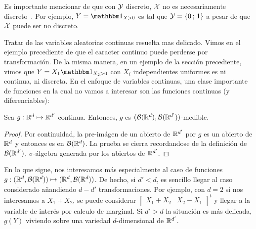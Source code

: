 Es  importante mencionar de  que con  $\mathcal{Y}$ discreto,  $\mathcal{X}$ no  es necesariamente
discreto~\cite{AthLah06}. Por ejemplo, $Y = \un_{X>0}$  es tal que $\mathcal{Y} = \{ 0 \, ; \, 1 \}$ a pesar de que $\mathcal{X}$ puede ser no discreto.

Tratar de las variables aleatorias  continuas resuelta mas delicado. Vimos en el
ejemplo   precediente  de   que  el   caracter  continuo   puede   perderse  por
transformaci\'on. De la misma manera, en un ejemplo de la secci\'on precediente,
vimos  que  $Y =  X_1  \un_{X_2>0}$ con  $X_i$  independientes  uniformes es  ni
continua,  ni  discreta.  En  el  enfoque  de  variables  continuas,  una  clase
importante  de funciones  en la  cual  no vamos  a interesar  son las  funciones
continuas (y diferenciables):
%
\begin{lema}
\label{Lem:MP:ContinuidadCaracterMedible}
%
  Sea   $g:   \mathbb{R}^d   \mapsto   \mathbb{R}^{d'}$   continua.   Entonces,   $g$   es
  $(\mathcal{B}(\mathbb{R}^d),\mathcal{B}(\mathbb{R}^{d'}))$-medible.
\end{lema}
%
\begin{proof}
  Por continuidad,  la pre-im\'agen de  un abierto de  $\mathbb{R}^{d'}$ por $g$  es un
  abierto  de $\mathbb{R}^d$  y entonces  es en  $\mathcal{B}(\mathbb{R}^d)$. La  prueba  se cierra
  recordandose  de  la   definici\'on  de  $\mathcal{B}(\mathbb{R}^{d'})$,  $\sigma$-\'algebra
  generada por los abiertos de $\mathbb{R}^{d'}$.
\end{proof}

En lo  que sigue, nos interesamos  m\'as especialmente al caso  de funciones $g:
(\mathbb{R}^d ,  \mathcal{B}(\mathbb{R}^d)) \mapsto (\mathbb{R}^d ,  \mathcal{B}(\mathbb{R}^d))$.  De hecho,  si $d' <
d$,   es    sencillo   llegar   al   caso    considerado   a\~nandiendo   $d-d'$
transformaciones. Por ejemplo, con $d = 2$  si nos interesamos a $X_1 + X_2$, se
puede considerar $\begin{bmatrix} X_1 + X_2 & X_2 - X_1\end{bmatrix}^t$ y llegar
a la variable de  inter\'es por calculo de marginal. Si $d'  > d$ la situaci\'on
es  m\'as  delicada,  $g(Y)$  viviendo  sobre una  variedad  $d$-dimensional  de
$\mathbb{R}^{d'}$.


